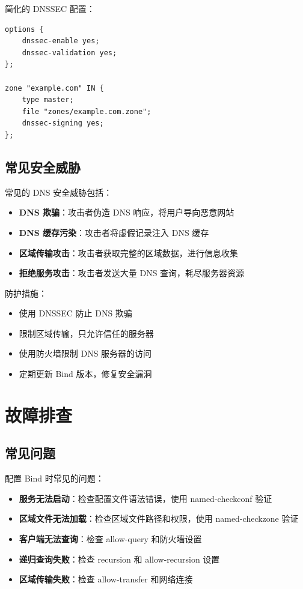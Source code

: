 \documentclass[12pt,UTF8]{ctexbook}
\begin{document}
简化的 DNSSEC 配置：
\begin{verbatim}
options {
    dnssec-enable yes;
    dnssec-validation yes;
};

zone "example.com" IN {
    type master;
    file "zones/example.com.zone";
    dnssec-signing yes;
};
\end{verbatim}

\section{常见安全威胁}
\label{sec:security_threats}

常见的 DNS 安全威胁包括：

\begin{itemize}
    \item \textbf{DNS 欺骗}：攻击者伪造 DNS 响应，将用户导向恶意网站
    \item \textbf{DNS 缓存污染}：攻击者将虚假记录注入 DNS 缓存
    \item \textbf{区域传输攻击}：攻击者获取完整的区域数据，进行信息收集
    \item \textbf{拒绝服务攻击}：攻击者发送大量 DNS 查询，耗尽服务器资源
\end{itemize}

防护措施：
\begin{itemize}
    \item 使用 DNSSEC 防止 DNS 欺骗
    \item 限制区域传输，只允许信任的服务器
    \item 使用防火墙限制 DNS 服务器的访问
    \item 定期更新 Bind 版本，修复安全漏洞
\end{itemize}

\chapter{故障排查}
\label{chap:troubleshooting}

\section{常见问题}
\label{sec:common_problems}

配置 Bind 时常见的问题：

\begin{itemize}
    \item \textbf{服务无法启动}：检查配置文件语法错误，使用 named-checkconf 验证
    \item \textbf{区域文件无法加载}：检查区域文件路径和权限，使用 named-checkzone 验证
    \item \textbf{客户端无法查询}：检查 allow-query 和防火墙设置
    \item \textbf{递归查询失败}：检查 recursion 和 allow-recursion 设置
    \item \textbf{区域传输失败}：检查 allow-transfer 和网络连接
\end{itemize}
\end{document}
